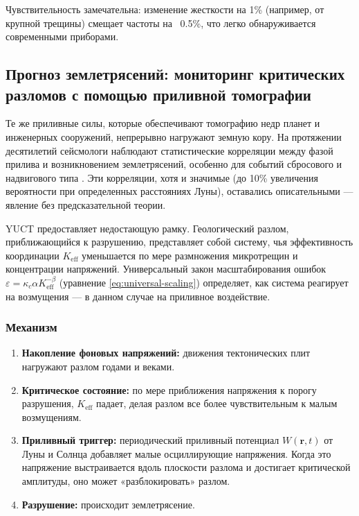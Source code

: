 \documentclass[12pt,a4paper]{article}
\theoremstyle{remark}
\begin{document}
	Чувствительность замечательна: изменение жесткости на 1\% (например, от крупной трещины) смещает частоты на ~0.5\%, что легко обнаруживается современными приборами.
	
	\subsection{Прогноз землетрясений: мониторинг критических разломов с помощью приливной томографии}
	\label{sec:earthquakes}
	
	Те же приливные силы, которые обеспечивают томографию недр планет и инженерных сооружений, непрерывно нагружают земную кору. На протяжении десятилетий сейсмологи наблюдают статистические корреляции между фазой прилива и возникновением землетрясений, особенно для событий сбросового и надвигового типа \cite{Tanaka2012, Tolstoy2013, Sibgatulin2014, RAN2025}. Эти корреляции, хотя и значимые (до 10\% увеличения вероятности при определенных расстояниях Луны), оставались описательными — явление без предсказательной теории.
	
	YUCT предоставляет недостающую рамку. Геологический разлом, приближающийся к разрушению, представляет собой систему, чья эффективность координации \(K_{\mathrm{eff}}\) уменьшается по мере размножения микротрещин и концентрации напряжений. Универсальный закон масштабирования ошибок \(\varepsilon = \kappa_c \alpha K_{\mathrm{eff}}^{-\beta}\) (уравнение \ref{eq:universal-scaling}) определяет, как система реагирует на возмущения — в данном случае на приливное воздействие.
	
	\subsubsection{Механизм}
	
	\begin{enumerate}
		\item \textbf{Накопление фоновых напряжений:} движения тектонических плит нагружают разлом годами и веками.
		\item \textbf{Критическое состояние:} по мере приближения напряжения к порогу разрушения, \(K_{\mathrm{eff}}\) падает, делая разлом все более чувствительным к малым возмущениям.
		\item \textbf{Приливный триггер:} периодический приливный потенциал \(W(\mathbf{r},t)\) от Луны и Солнца добавляет малые осциллирующие напряжения. Когда это напряжение выстраивается вдоль плоскости разлома и достигает критической амплитуды, оно может «разблокировать» разлом.
		\item \textbf{Разрушение:} происходит землетрясение.
	\end{enumerate}
	
\end{document}
